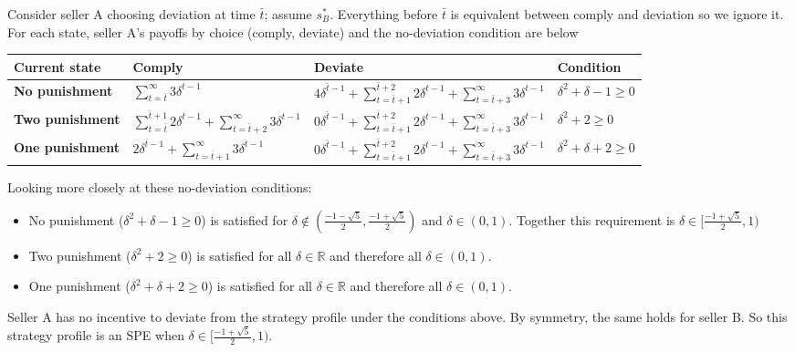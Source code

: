 \documentclass[11pt]{exam}
\begin{document}
\begin{questions}
\begin{parts}
        Consider seller A choosing deviation at time $\bar t$; assume $s^*_B$. Everything before $\bar t$ is equivalent between comply and deviation so we ignore it. For each state, seller A's payoffs by choice (comply, deviate) and the no-deviation condition are below
        \begin{table}[h!]
        \centering
        \begin{tabular}{l|lll}
            \textbf{Current state} & \textbf{Comply} & \textbf{Deviate} & \textbf{Condition} \\
            \hline
            \textbf{No punishment} 
                & $\sum_{t=\bar t}^\infty 3\delta^{t-1}$ 
                & $4\delta^{\bar t-1} + \sum_{t=\bar t+1}^{\bar t+2} 2\delta^{t-1} + \sum_{t=\bar t+3}^\infty 3\delta^{t-1}$
                & $\delta^2 + \delta - 1 \geq 0$ \\
            \textbf{Two punishment} 
                & $\sum_{t=\bar t}^{\bar t+1} 2\delta^{t-1} + \sum_{t=\bar t+2}^\infty 3\delta^{t-1}$  
                & $0\delta^{\bar t-1} + \sum_{t=\bar t+1}^{\bar t+2} 2\delta^{t-1} + \sum_{t=\bar t+3}^\infty 3\delta^{t-1}$ 
                & $\delta^2 +2 \geq 0$\\
            \textbf{One punishment} 
                & $2\delta^{\bar t-1} + \sum_{t=\bar t+1}^\infty 3\delta^{t-1}$  
                & $0\delta^{\bar t-1} + \sum_{t=\bar t+1}^{\bar t+2} 2\delta^{t-1} + \sum_{t=\bar t+3}^\infty 3\delta^{t-1}$
                & $\delta^2 + \delta + 2 \geq 0$
        \end{tabular}
        \end{table}
        Looking more closely at these no-deviation conditions:
        \begin{itemize}
            \item No punishment ($\delta^2 + \delta - 1 \geq 0$) is satisfied for $\delta \notin (\tfrac{-1-\sqrt5}{2}, \tfrac{-1+\sqrt5}{2} )$ and $\delta \in (0,1)$. Together this requirement is $\delta \in [\tfrac{-1+\sqrt5}{2}, 1)$
            \item Two punishment ($\delta^2 +2 \geq 0$) is satisfied for all $\delta \in \mathbb R$ and therefore all $\delta \in(0,1)$.
            \item One punishment ($\delta^2 + \delta + 2 \geq 0$) is satisfied for all $\delta\in\mathbb R$ and therefore all $\delta \in(0,1)$.
        \end{itemize}
        Seller A has no incentive to deviate from the strategy profile under the conditions above. By symmetry, the same holds for seller B. So this strategy profile is an SPE when $\delta \in [\tfrac{-1+\sqrt5}{2}, 1)$.


\end{parts}
\end{questions}
\end{document}
